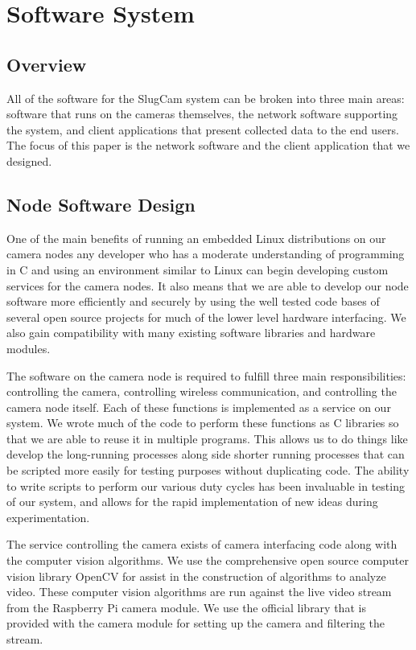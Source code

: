 \section{Software System}
\subsection{Overview}

All of the software for the SlugCam system can be broken into three main areas:
software that runs on the cameras themselves, the network software supporting
the system, and client applications that present collected data to the end
users. The focus of this paper is the network software and the client
application that we designed.

\subsection{Node Software Design}

One of the main benefits of running an embedded Linux distributions on our
camera nodes any developer who has a moderate understanding of programming in C
and using an environment similar to Linux can begin developing custom services
for the camera nodes. It also means that we are able to develop our node
software more efficiently and securely by using the well tested code bases of
several open source projects for much of the lower level hardware interfacing.
We also gain compatibility with many existing software libraries and hardware
modules.

The software on the camera node is required to fulfill three main
responsibilities: controlling the camera, controlling wireless communication,
and controlling the camera node itself. Each of these functions is implemented
as a service on our system. We wrote much of the code to perform these functions
as C libraries so that we are able to reuse it in multiple programs. This
allows us to do things like develop the long-running processes along side
shorter running processes that can be scripted more easily for testing purposes
without duplicating code. The ability to write scripts to perform our various
duty cycles has been invaluable in testing of our system, and allows for the
rapid implementation of new ideas during experimentation.

The service controlling the camera exists of camera interfacing code along with
the computer vision algorithms. We use the comprehensive open source computer
vision library OpenCV for assist in the construction of algorithms to analyze
video. These computer vision algorithms are run against the live video stream
from the Raspberry Pi camera module. We use the official library that is
provided with the camera module for setting up the camera and filtering the
stream.

